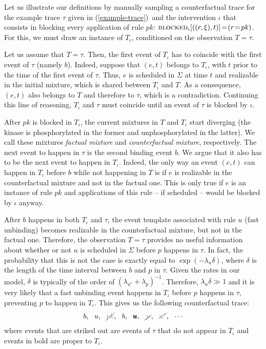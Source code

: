 \newcommand{\RTrace}{T} \newcommand{\ATrace}{T_\iota} Let us
illustrate our definitions by manually sampling a counterfactual trace
for the example trace $\tau$ given in (\ref{example-trace})\, and the
intervention $\iota$ that consists in blocking every application of
rule $pk$:
${\textsc{blocked}}_{\iota}[((r, \xi), t)] \!=\! (r \!=\! pk)$.
For this, we must draw an instance of $\ATrace$, conditioned on the
observation $\RTrace \!=\! \tau$.

Let us assume that $\RTrace \!=\! \tau$. Then, the first event of
$\ATrace$ has to coincide with the first event of $\tau$ (namely $b$).
Indeed, suppose that $(e, t)$ belongs to $\ATrace$, with $t$ prior to
the time of the first event of $\tau$. Thus, $e$ is scheduled in
$\Sigma$ at time $t$ and realizable in the initial mixture, which is
shared between $\ATrace$ and $\RTrace$. As a consequence, $(e, t)$
also belongs to $\RTrace$ and therefore to $\tau$, which is a
contradiction. Continuing this line of reasoning, $\ATrace$ and $\tau$
must coincide until an event of $\tau$ is blocked by $\iota$.

After $pk$ is blocked in $\ATrace$, the current mixtures in $T$ and
$T_\iota$ start diverging (the kinase is phosphorylated in the former
and unphosphorylated in the latter). We call these mixtures
\emph{factual mixture} and \emph{counterfactual mixture}, respectively.
The next event to happen in $\tau$ is the second binding event $b$. We
argue that it also has to be the next event to happen in
$T_\iota$. Indeed, the only way an event $(e, t)$ can happen in
$\ATrace$ before $b$ while not happening in $\RTrace$ is if $e$ is
realizable in the counterfactual mixture and not in the factual
one. This is only true if $e$ is an instance of rule $pk$ and
applications of this rule -- if scheduled -- would be blocked by
$\iota$ anyway.

After $b$ happens in both $\ATrace$ and $\tau$, the event template
associated with rule $u$ (fast unbinding) becomes realizable in the
counterfactual mixture, but not in the factual one. Therefore, the
observation $T\!=\!\tau$ provides no useful information about whether
or not $u$ is scheduled in $\Sigma$ before $p$ happens in $\tau$. In
fact, the probability that this is not the case is exactly equal to
$\exp(-\lambda_u\delta)$, where $\delta$ is the length of the time
interval between $b$ and $p$ in $\tau$. Given the rates in our model,
$\delta$ is typically of the order of
$(\lambda_{u^*}+\lambda_p)^{-1}$. Therefore, $\lambda_u\delta \gg 1$
and it is very likely that a fast unbinding event happens in $\ATrace$
before $p$ happens in $\tau$, preventing $p$ to happen in $\ATrace$.
This gives us the following counterfactual trace:
\begin{align}
  \label{counterfactual-trace} 
  b,\ \ u,\ \ \strikeout{pk}, \ \ b, \ \ \pmb{u}, \ \ \strikeout{\,p\,}, 
  \ \ \strikeout{u^*}, \ \ \cdots
\end{align} 
where events that are striked out are events of $\tau$ that do not
appear in $\ATrace$ and events in bold are proper to $\ATrace$.


